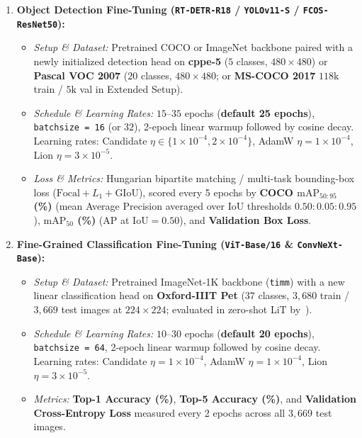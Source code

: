 \documentclass[11pt,a4paper]{article}
\renewcommand{\_}{\origunderscore\allowbreak}
\begin{document}
\begin{enumerate}[label=\textbf{V-B\arabic*.}, leftmargin=3.2em, itemsep=0.45em]
    \item \textbf{Object Detection Fine-Tuning (\texttt{RT-DETR-R18} / \texttt{YOLOv11-S} / \texttt{FCOS-ResNet50}):}
    \begin{itemize}[leftmargin=1.5em, itemsep=0.25em]
        \item \textit{Setup \& Dataset:} Pretrained COCO or ImageNet backbone paired with a newly initialized detection head on \textbf{cppe-5} ($5$ classes, $480 \times 480$) or \textbf{Pascal VOC 2007} ($20$ classes, $480 \times 480$; or \textbf{MS-COCO 2017} $118\text{k}$ train / $5\text{k}$ val in Extended Setup).
        \item \textit{Schedule \& Learning Rates:} $15$--$35$ epochs (\textbf{default 25 epochs}), \texttt{batch\_size = 16} (or $32$), 2-epoch linear warmup followed by cosine decay. Learning rates: Candidate $\eta \in \{1 \times 10^{-4}, 2 \times 10^{-4}\}$, AdamW $\eta = 1 \times 10^{-4}$, Lion $\eta = 3 \times 10^{-5}$.
        \item \textit{Loss \& Metrics:} Hungarian bipartite matching / multi-task bounding-box loss ($\text{Focal} + L_1 + \text{GIoU}$), scored every 5 epochs by \textbf{COCO $\text{mAP}_{50:95}$ (\%)} (mean Average Precision averaged over IoU thresholds $0.50:0.05:0.95$), \textbf{$\text{mAP}_{50}$ (\%)} (AP at $\text{IoU} = 0.50$), and \textbf{Validation Box Loss}.
    \end{itemize}

    \item \textbf{Fine-Grained Classification Fine-Tuning (\texttt{ViT-Base/16} \& \texttt{ConvNeXt-Base}):}
    \begin{itemize}[leftmargin=1.5em, itemsep=0.25em]
        \item \textit{Setup \& Dataset:} Pretrained ImageNet-1K backbone (\texttt{timm}) with a new linear classification head on \textbf{Oxford-IIIT Pet} ($37$ classes, $3,680$ train / $3,669$ test images at $224 \times 224$; evaluated in zero-shot LiT by~\cite{chen2023lion}).
        \item \textit{Schedule \& Learning Rates:} $10$--$30$ epochs (\textbf{default 20 epochs}), \texttt{batch\_size = 64}, 2-epoch linear warmup followed by cosine decay. Learning rates: Candidate $\eta = 1 \times 10^{-4}$, AdamW $\eta = 1 \times 10^{-4}$, Lion $\eta = 3 \times 10^{-5}$.
        \item \textit{Metrics:} \textbf{Top-1 Accuracy (\%)}, \textbf{Top-5 Accuracy (\%)}, and \textbf{Validation Cross-Entropy Loss} measured every 2 epochs across all $3,669$ test images.
    \end{itemize}
\end{enumerate}
\end{document}
